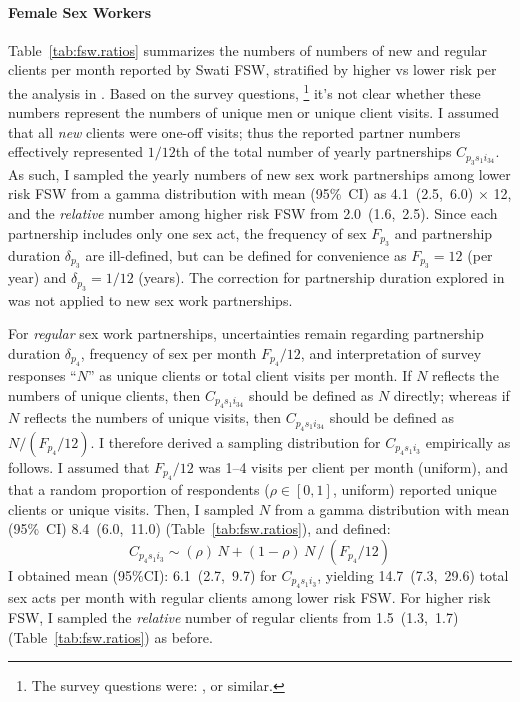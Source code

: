 \paragraph{Female Sex Workers}
Table~\ref{tab:fsw.ratios} summarizes the numbers of
numbers of new and regular clients per month reported by Swati FSW,
stratified by higher vs lower risk per the analysis in .
Based on the survey questions,%
\footnote{The survey questions were: , or similar.}
it's not clear whether these numbers represent the numbers of unique men or unique client visits.
I assumed that all \emph{new} clients were one-off visits;
thus the reported partner numbers effectively represented $1/12$th of the total number of
yearly partnerships $C_{p_{3}s_{1}i_{34}}$.
As such, I sampled the yearly numbers of new sex work partnerships among lower risk FSW
from a gamma distribution with mean (95\%~CI) as 4.1~(2.5,~6.0) $\times$ 12,
and the \emph{relative} number among higher risk FSW from 2.0~(1.6,~2.5).
Since each partnership includes only one sex act,
the frequency of sex $F_{p_{3}}$ and partnership duration $\delta_{p_{3}}$ are ill-defined,
but can be defined for convenience as
$F_{p_{3}} = 12$ (per year) and $\delta_{p_{3}} = 1/12$ (years).
The correction for partnership duration explored in 
was not applied to new sex work partnerships. %
\par
For \emph{regular} sex work partnerships, uncertainties remain regarding
partnership duration $\delta_{p_{4}}$, frequency of sex per month $F_{p_{4}}/12$, and
interpretation of survey responses ``$N$'' as unique clients or total client visits per month.
If $N$ reflects the numbers of unique clients, then
$C_{p_{4}s_{1}i_{34}}$ should be defined as $N$ directly;
whereas if $N$ reflects the numbers of unique visits, then
$C_{p_{4}s_{1}i_{34}}$ should be defined as $N/(F_{p_{4}}/12)$.
I therefore derived a sampling distribution for $C_{p_{4}s_{1}i_{3}}$ empirically as follows.
I assumed that $F_{p_{4}}/12$ was 1--4 visits per client per month (uniform),
and that a random proportion of respondents ($\rho \in [0,1]$, uniform)
reported unique clients or unique visits.
Then, I sampled $N$ from a gamma distribution with mean (95\%~CI) 8.4~(6.0,~11.0)
(Table~\ref{tab:fsw.ratios}), and defined:
\begin{equation}
  C_{p_{4}s_{1}i_{3}} \sim (\rho)\,N + (1-\rho)\,N\,/\,(F_{p_{4}}/12)
\end{equation}
I obtained mean (95\%CI): 6.1~(2.7,~9.7) for $C_{p_{4}s_{1}i_{3}}$,
yielding 14.7~(7.3,~29.6) total sex acts per month with regular clients among lower risk FSW.
For higher risk FSW, I sampled the \emph{relative} number of regular clients from
1.5~(1.3,~1.7) (Table~\ref{tab:fsw.ratios}) as before.

